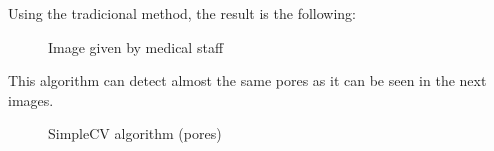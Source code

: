 Using the tradicional method, the result is the following:

    \begin{figure}[H]
      \caption{Image given by medical staff}
      \centering \setlength\fboxsep{0pt} \setlength\fboxrule{0.5pt}
    \end{figure}

This algorithm can detect almost the same pores as it can be seen in the next images.\\

    \begin{figure}[H]
      \caption{SimpleCV algorithm (pores)}
      \centering \setlength\fboxsep{0pt} \setlength\fboxrule{0.5pt}
    \end{figure}

